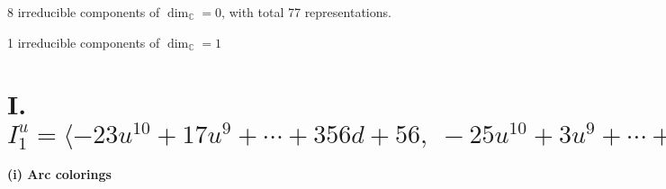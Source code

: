 \documentclass[1p]{elsarticle_modified}
\theoremstyle{definition}
\begin{document}
\raggedright * 8 irreducible components of $\dim_{\mathbb{C}}=0$, with total 77 representations.\\
\raggedright * 1 irreducible components of $\dim_{\mathbb{C}}=1$ \\
\newpage
\renewcommand{\arraystretch}{1}
\centering \section*{I. $I^u_{1}= \langle -23 u^{10}+17 u^{9}+\cdots+356 d+56,\;-25 u^{10}+3 u^{9}+\cdots+356 c-32,\;-21 u^{10}+31 u^{9}+\cdots+356 b+144,\;4 u^{10}+28 u^9+\cdots+356 a+176,\;u^{11}- u^{10}+\cdots-4 u+4 \rangle$}
\flushleft \textbf{(i) Arc colorings}\\
\end{document}
